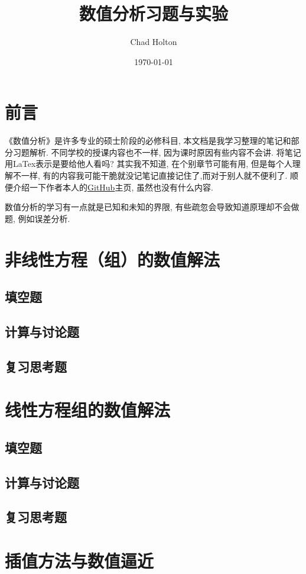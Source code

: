 \documentclass[lang=cn,newtx,12pt,scheme=chinese]{elegantbook}
\title{数值分析习题与实验}
\author{Chad Holton}
\date{\today}
\begin{document}
\maketitle
\frontmatter

\tableofcontents

\mainmatter
\chapter*{前言}
《数值分析》是许多专业的硕士阶段的必修科目, 本文档是我学习整理的笔记和部分习题解析. 不同学校的授课内容也不一样, 因为课时原因有些内容不会讲. 将笔记用LaTex表示是要给他人看吗? 其实我不知道, 在个别章节可能有用, 但是每个人理解不一样, 有的内容我可能干脆就没记笔记直接记住了,而对于别人就不便利了. 顺便介绍一下作者本人的\href{https://github.com/phychi}{GitHub}主页, 虽然也没有什么内容.

数值分析的学习有一点就是已知和未知的界限, 有些疏忽会导致知道原理却不会做题, 例如误差分析. 
\chapter{非线性方程（组）的数值解法}
\section{填空题}
\section{计算与讨论题}
\section{复习思考题}
\chapter{线性方程组的数值解法}
\section{填空题}
\section{计算与讨论题}
\section{复习思考题}
\chapter{插值方法与数值逼近}
\end{document}
